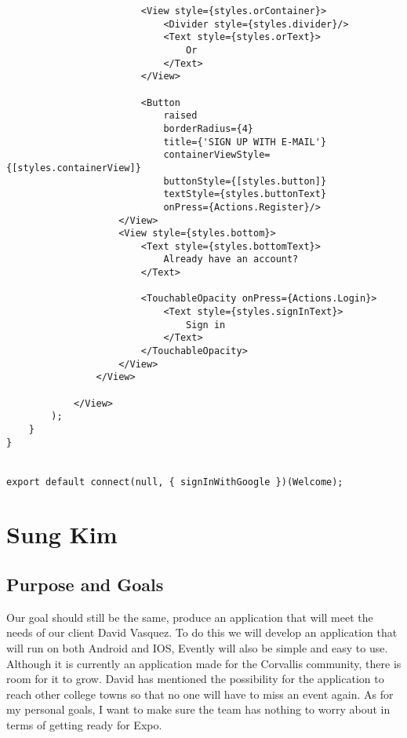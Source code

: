 \documentclass[letterpaper, 10pt,titlepage]{article}
\begin{document}
\begin{verbatim}
                        <View style={styles.orContainer}>
                            <Divider style={styles.divider}/>
                            <Text style={styles.orText}>
                                Or
                            </Text>
                        </View>

                        <Button
                            raised
                            borderRadius={4}
                            title={'SIGN UP WITH E-MAIL'}
                            containerViewStyle={[styles.containerView]}
                            buttonStyle={[styles.button]}
                            textStyle={styles.buttonText}
                            onPress={Actions.Register}/>
                    </View>
                    <View style={styles.bottom}>
                        <Text style={styles.bottomText}>
                            Already have an account?
                        </Text>

                        <TouchableOpacity onPress={Actions.Login}>
                            <Text style={styles.signInText}>
                                Sign in
                            </Text>
                        </TouchableOpacity>
                    </View>
                </View>

            </View>
        );
    }
}


export default connect(null, { signInWithGoogle })(Welcome);

\end{verbatim}

\section{Sung Kim}
\subsection{Purpose and Goals}

Our goal should still be the same, produce an application that will meet the needs of our client David Vasquez. To do this we will develop an application that will run on both Android and IOS, Evently will also be simple and easy to use. Although it is currently an application made for the Corvallis community, there is room for it to grow. David has mentioned the possibility for the application to reach other college towns so that no one will have to miss an event again. As for my personal goals, I want to make sure the team has nothing to worry about in terms of getting ready for Expo.
\end{document}
